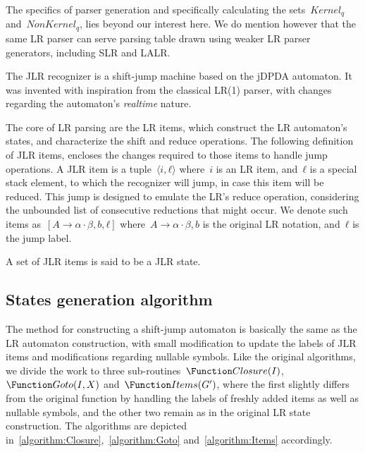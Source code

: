The specifics of parser generation and specifically
calculating the sets~$Kernel_{q}$ and~$NonKernel_{q}$, lies beyond our interest here.
We do mention however that the same LR parser can serve parsing table drawn using weaker LR parser generators,
including SLR and LALR\@.

The JLR recognizer is a shift-jump machine
based on the jDPDA automaton.
It was invented with inspiration from the classical
LR(1) parser, with changes regarding the automaton's
\emph{realtime} nature.

The core of LR parsing are the LR items,
which construct the LR automaton's states, and
characterize the shift and reduce operations.
The following definition of JLR items,
encloses the changes required to those items to handle
jump operations.
A JLR item is a tuple~$⟨i,ℓ⟩$ where~$i$ is an
LR item, and~$ℓ$ is a special stack element,
to which the recognizer will jump, in case this item will
be reduced.
This jump is designed to emulate the LR's
reduce operation, considering the unbounded list of consecutive
reductions that might occur.
We denote such items as~$[A→α·β, b,ℓ]$
where~$A→α·β, b$ is the original LR notation, and~$ℓ$
is the jump label.

A set of JLR items is said to be a JLR state.

\subsection{States generation algorithm}
The method for constructing a shift-jump automaton
is basically the same as the LR automaton construction,
with small modification to update the labels of JLR items
and modifications regarding nullable symbols.
Like the original algorithms, we divide the work to three
sub-routines~$\Function Closure(I)$,~$\Function Goto(I,X)$ and~$\Function Items(G')$,
where the first slightly differs from the original function by handling the
labels of freshly added items as well as nullable symbols,
and the other two remain as in the original LR state construction.
The algorithms are depicted in~\cref{algorithm:Closure},~\cref{algorithm:Goto}
and~\cref{algorithm:Items} accordingly.


